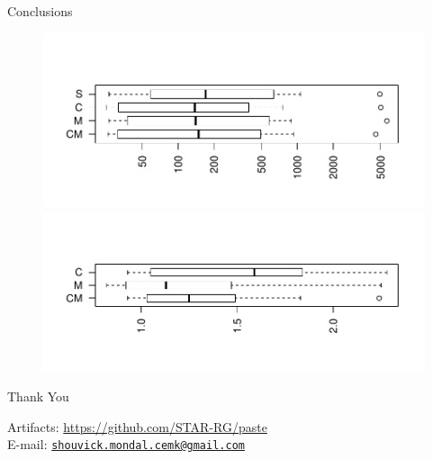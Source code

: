 \documentclass{beamer}
\begin{document}
\begin{frame}{Conclusions}
\begin{center}
\begin{figure}[!htb]
\pause
\begin{minipage}{0.5\textwidth}
	\centering
	\includegraphics[width=1.175\linewidth]{images/time.pdf}\vspace{-1cm}
	\includegraphics[width=1.175\linewidth]{images/speedup.pdf}	
\end{minipage}
\end{figure}	
\vfill
\vfill
\pause
\begin{Large}
	Thank You
\end{Large}
\vfill
\begin{footnotesize}
	Artifacts: \url{https://github.com/STAR-RG/paste}\\
	E-mail: \href{mailto:shouvick.mondal.cemk@gmail.com}{\texttt{shouvick.mondal.cemk@gmail.com}}
\end{footnotesize}
\end{center}
\end{frame}


\end{document}
